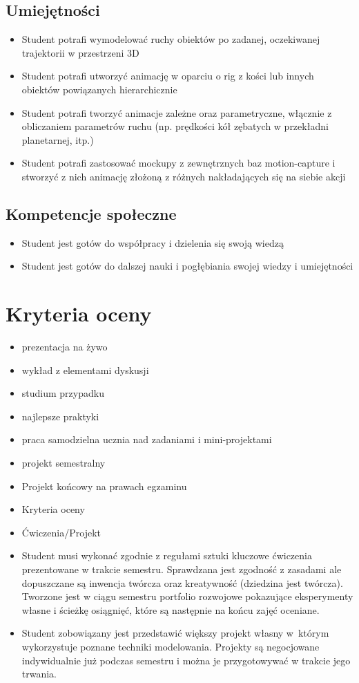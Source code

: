 \documentclass[12pt, a4paper]{article}
\begin{document}
\subsection*{Umiejętności}
\begin{itemize}
  \item Student potrafi wymodelować ruchy obiektów po zadanej, oczekiwanej trajektorii w przestrzeni 3D
  \item Student potrafi utworzyć animację w oparciu o rig z kości lub innych obiektów powiązanych hierarchicznie
  \item Student potrafi tworzyć animacje zależne oraz parametryczne, włącznie z obliczaniem parametrów ruchu (np. prędkości kół zębatych w przekładni planetarnej, itp.)
  \item Student potrafi zastosować mockupy z zewnętrznych baz motion-capture i stworzyć z nich animację złożoną z różnych nakładających się na siebie akcji
\end{itemize}

\subsection*{Kompetencje społeczne}
\begin{itemize}
  \item Student jest gotów do współpracy i dzielenia się swoją wiedzą
  \item Student jest gotów do dalszej nauki i pogłębiania swojej wiedzy i umiejętności
\end{itemize}

\section{Kryteria oceny}

\begin{itemize}
  \item prezentacja na żywo
  \item wykład z elementami dyskusji
  \item studium przypadku
  \item najlepsze praktyki
  \item praca samodzielna ucznia nad zadaniami i mini-projektami
  \item projekt semestralny
  \item Projekt końcowy na prawach egzaminu
  \item Kryteria oceny
  \item Ćwiczenia/Projekt
  \item Student musi wykonać zgodnie z regułami sztuki kluczowe ćwiczenia prezentowane w trakcie semestru. Sprawdzana jest zgodność z zasadami ale dopuszczane są inwencja twórcza oraz kreatywność (dziedzina jest twórcza). Tworzone jest w ciągu semestru portfolio rozwojowe pokazujące eksperymenty własne i ścieżkę osiągnięć, które są następnie na końcu zajęć oceniane.
  \item Student zobowiązany jest przedstawić większy projekt własny w którym wykorzystuje poznane techniki modelowania. Projekty są negocjowane indywidualnie już podczas semestru i można je przygotowywać w trakcie jego trwania.
\end{itemize}
\end{document}
